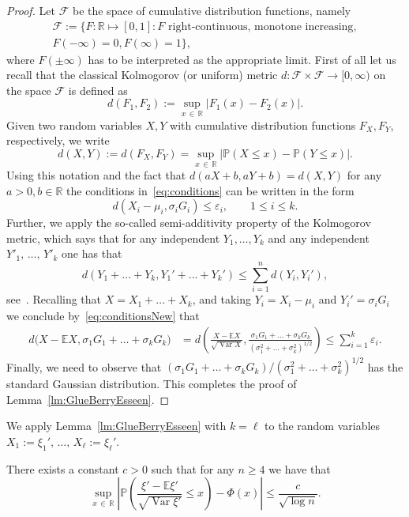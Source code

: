\documentclass[AHL,Unicode,longabstracts,published]{cedram}
\newcommand{\var}{\operatorname{Var}}
\newcommand{\bbR}{\mathbb{R}}
\newcommand{\bbE}{\mathbb{E}}
\newcommand{\bbP}{\mathbb{P}}
\newcommand{\clF}{\mathcal{F}}
\begin{document}
\begin{proof}
Let $\clF$ be the space of cumulative distribution functions, namely
\begin{multline*}
\clF:=\big\{F:\bbR\mapsto[0,1]\colon F \text{ right-continuous, monotone increasing},
\\ F(-\infty)=0, F(\infty)=1\big\},
\end{multline*}
where $F(\pm\infty)$ has to be interpreted as the appropriate limit. First of all let us recall that the classical Kolmogorov (or uniform) metric $d:\clF\times\clF\to [0,\infty)$ on the space $\clF$ is defined as
\[
d(F_1,F_2):=\sup_{x\,\in\,\bbR}|F_1(x)-F_2(x)|.
\]
Given two random variables $X,Y$ with cumulative distribution functions $F_X,F_Y$, respectively, we write
\[
d(X,Y):=d(F_X,F_Y)=\sup_{x\,\in\,\bbR}\left|\bbP(X\leq x)-\bbP(Y\leq x)\right|.
\]
Using this notation and the fact that $d(aX+b,aY+b)=d(X,Y)$ for any $a>0,b\in\bbR$ the conditions in~\eqref{eq:conditions} can be written in the form
\begin{equation}\label{eq:conditionsNew}
d(X_i-\mu_i,\sigma_i G_i)\leq \varepsilon_i,\qquad 1\leq i\leq k.
\end{equation}
Further, we apply the so-called semi-additivity property of the Kolmogorov metric, which says that for any independent $Y_1,\ldots,Y_k$ and any independent $Y'_1,\,\ldots,\,Y'_k$ one has that
\[
d(Y_1+\ldots+Y_k,Y_1'+\ldots+Y_k')\leq \sum_{i=1}^n d(Y_i,Y_i'),
\]
see~\cite[Section~2.3, Equation~(1.2)]{Zol76}. Recalling that $X=X_1+\ldots+X_k$, and taking $Y_i=X_i-\mu_i$ and $Y_i'=\sigma_i G_i$ we conclude by~\eqref{eq:conditionsNew} that
\begin{align*}
d\big(X-\bbE X, \sigma_1 G_1+\ldots+\sigma_k G_k\big)&=d\left(\frac{X-\bbE X}{\sqrt{\var X}}, \frac{\sigma_1 G_1+\ldots+\sigma_k G_k}{(\sigma_1^2+\ldots+\sigma_k^2)^{1/2}}\right)\leq \sum_{i=1}^k\varepsilon_i.
\end{align*}
Finally, we need to observe that $(\sigma_1 G_1+\ldots+\sigma_k G_k)/(\sigma_1^2+\ldots+\sigma_k^2)^{1/2}$ has the standard Gaussian distribution. This completes the proof of Lemma~\ref{lm:GlueBerryEsseen}.
\end{proof}

We apply Lemma~\ref{lm:GlueBerryEsseen} with $k=\ell$ to the random variables $X_1:=\xi_1',\,\ldots,\,X_\ell:=\xi_\ell'$.

\begin{coro}\label{cor:PoissonWithZ}
There exists a constant $c>0$ such that for any $n\geq 4$ we have that
\[
\sup_{x\,\in\,\bbR}\left|\bbP\left(\frac{\xi'-\bbE\xi'}{\sqrt{\var \xi'}}\leq x\right)-\Phi(x)\right|\leq \frac{c}{\sqrt{\log n}}.
\]
\end{coro}
\end{document}

